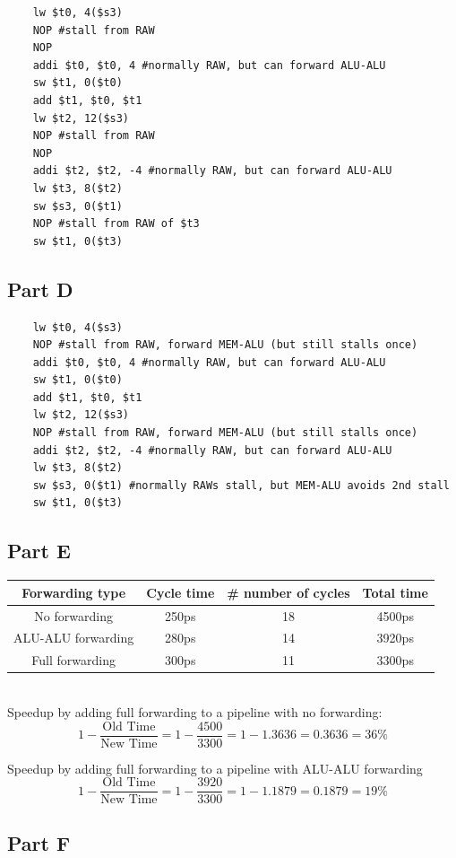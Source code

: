 \documentclass[11pt]{article} %
\begin{document}
\begin{verbatim}
    lw $t0, 4($s3)
    NOP #stall from RAW
    NOP
    addi $t0, $t0, 4 #normally RAW, but can forward ALU-ALU
    sw $t1, 0($t0)
    add $t1, $t0, $t1
    lw $t2, 12($s3)
    NOP #stall from RAW
    NOP
    addi $t2, $t2, -4 #normally RAW, but can forward ALU-ALU
    lw $t3, 8($t2)
    sw $s3, 0($t1)
    NOP #stall from RAW of $t3
    sw $t1, 0($t3)
\end{verbatim}

\subsection{Part D}

\begin{verbatim}
    lw $t0, 4($s3) 
    NOP #stall from RAW, forward MEM-ALU (but still stalls once)
    addi $t0, $t0, 4 #normally RAW, but can forward ALU-ALU
    sw $t1, 0($t0)
    add $t1, $t0, $t1
    lw $t2, 12($s3)
    NOP #stall from RAW, forward MEM-ALU (but still stalls once)
    addi $t2, $t2, -4 #normally RAW, but can forward ALU-ALU
    lw $t3, 8($t2)
    sw $s3, 0($t1) #normally RAWs stall, but MEM-ALU avoids 2nd stall
    sw $t1, 0($t3)
\end{verbatim}

\subsection{Part E}

\begin{tabular}{c|c|c|c}
Forwarding type & Cycle time & \# number of cycles & Total time\\\hline
No forwarding & 250ps & 18 & 4500ps \\
ALU-ALU forwarding & 280ps & 14 & 3920ps \\
Full forwarding & 300ps & 11 & 3300ps
\end{tabular}

\vspace{5mm}
\\Speedup by adding full forwarding to a pipeline with no forwarding:
\[
	1 - \frac{\text{Old Time}}{\text{New Time}} = 1 - \frac{4500}{3300} = 1 - 1.3636 = 0.3636 = 36\%
\]

Speedup by adding full forwarding to a pipeline with ALU-ALU forwarding
\[
	1 - \frac{\text{Old Time}}{\text{New Time}} = 1 - \frac{3920}{3300} = 1 - 1.1879 = 0.1879 = 19\%
\]

\subsection{Part F}
\end{document}
